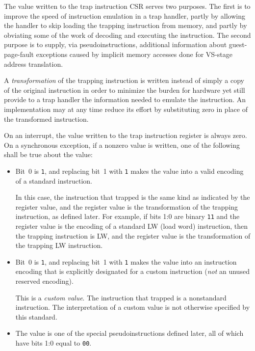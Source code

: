 \begin{commentary}
The value written to the trap instruction CSR serves two purposes.
The first is to improve the speed of instruction emulation in a trap
handler, partly by allowing the handler to skip loading the trapping
instruction from memory, and partly by obviating some of the work of
decoding and executing the instruction.
The second purpose is to supply, via pseudoinstructions, additional
information about guest-page-fault exceptions caused by implicit memory
accesses done for VS-stage address translation.

A \emph{transformation} of the trapping instruction is written instead of
simply a copy of the original instruction in order to minimize the burden
for hardware yet still provide to a trap handler the information needed
to emulate the instruction.
An implementation may at any time reduce its effort by substituting zero
in place of the transformed instruction.
\end{commentary}

On an interrupt, the value written to the trap instruction register is
always zero.
On a synchronous exception, if a nonzero value is written, one of the
following shall be true about the value:

\begin{itemize}

\item
Bit~0 is {\tt 1}, and replacing bit~1 with {\tt 1} makes the value into a
valid encoding of a standard instruction.

In this case, the instruction that trapped is the same kind as indicated
by the register value, and the register value is the transformation of
the trapping instruction, as defined later.
For example, if bits 1:0 are binary {\tt 11} and the register value is
the encoding of a standard LW (load word) instruction, then the trapping
instruction is LW, and the register value is the transformation of the
trapping LW instruction.

\item
Bit~0 is {\tt 1}, and replacing bit~1 with {\tt 1} makes the value into
an instruction encoding that is explicitly designated for a custom
instruction (\emph{not} an unused reserved encoding).

This is a \textit{custom value}.
The instruction that trapped is a nonstandard instruction.
The interpretation of a custom value is not otherwise specified by this
standard.

\item
The value is one of the special pseudoinstructions defined later, all of
which have bits 1:0 equal to {\tt 00}.

\end{itemize}

